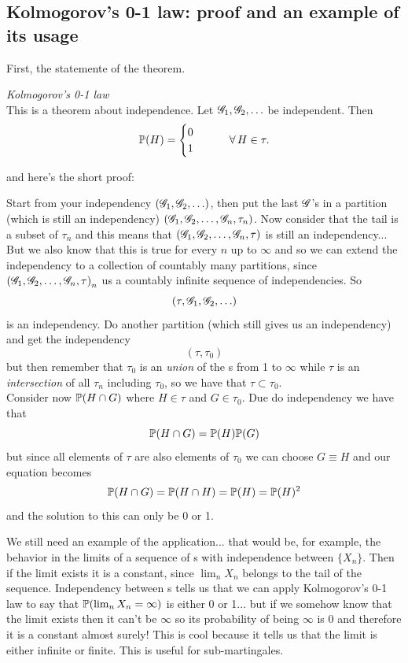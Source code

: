 \documentclass{report}
\begin{document}
\subsection{Kolmogorov’s 0-1 law: proof and an example of its usage}
First, the statemente of the theorem.
\begin{theorem}
	\emph{Kolmogorov's 0-1 law}\\
	This is a theorem about independence. Let $\mathscr{G}_1,\mathscr{G}_2,\ldots$ be independent. Then
	\[\mathbb{P}(H)=\begin{cases}
		0\\
		1
	\end{cases}\qquad\forall\, H\in\tau.\]
\end{theorem}
and here's the short proof:
\begin{fancyproof}
	Start from your independency $(\mathscr{G}_1,\mathscr{G}_2,\ldots)$, then put the last $\mathscr{G}$'s in a partition (which is still an independency) $(\mathscr{G}_1,\mathscr{G}_2,\ldots,\mathscr{G}_n,\tau_n)$. Now consider that the tail \sa{} is a subset of $\tau_n$ and this means that $(\mathscr{G}_1,\mathscr{G}_2,\ldots,\mathscr{G}_n,\tau)$ is still an independency... But we also know that this is true for every $n$ up to $\infty$ and so we can extend the independency to a collection of countably many partitions, since ${(\mathscr{G}_1,\mathscr{G}_2,\ldots,\mathscr{G}_n,\tau)}_{n}$ us a countably infinite sequence of independencies. So
	\begin{equation*}
		(\tau,\mathscr{G}_1,\mathscr{G}_2,\ldots)
	\end{equation*}
	is an independency. Do another partition (which still gives us an independency) and get the independency
	\begin{equation*}
		(\tau,\tau_0)
	\end{equation*}
	but then remember that $\tau_0$ is an \textit{union} of the \sa s from 1 to $\infty$ while $\tau$ is an \textit{intersection} of all $\tau_n$ including $\tau_0$, so we have that $\tau\subset\tau_0$.\\
	Consider now $\mathbb{P}(H\cap G)$ where $H\in\tau$ and $G\in\tau_0$. Due do independency we have that 
	\begin{equation*}
		\mathbb{P}(H\cap G)=\mathbb{P}(H)\mathbb{P}(G)
	\end{equation*}but since all elements of $\tau$ are also elements of $\tau_0$ we can choose $G\equiv H$ and our equation becomes
	\begin{equation*}
		\mathbb{P}(H\cap G)=\mathbb{P}(H\cap H)=\mathbb{P}(H)=\mathbb{P}(H)^{2}
	\end{equation*}
	and the solution to this can only be 0 or 1.
\end{fancyproof}
We still need an example of the application... that would be, for example, the behavior in the limits of a sequence of \rv s with independence between $\{X_{n}\}$. Then if the limit exists it is a constant, since $\lim_{n}X_{n}$ belongs to the tail \sa{} of the sequence. Independency between \rv s tells us that we can apply Kolmogorov's 0-1 law to say that $\mathbb{P}(\lim_{n}X_{n}=\infty)$ is either 0 or 1... but if we somehow know that the limit exists then it can't be $\infty$ so its probability of being $\infty$ is 0 and therefore it is a constant almost surely! This is cool because it tells us that the limit is either infinite or finite. This is useful for sub-martingales. 
\end{document}
